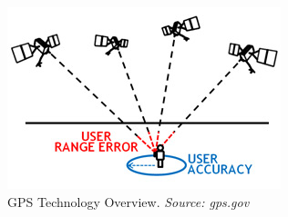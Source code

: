 \begin{figure}
    \includegraphics[scale=0.5]{figures/gps-how.jpg}
\caption{GPS Technology Overview. \textit{Source: gps.gov}}
\label{fig:gps:how}
\end{figure}
